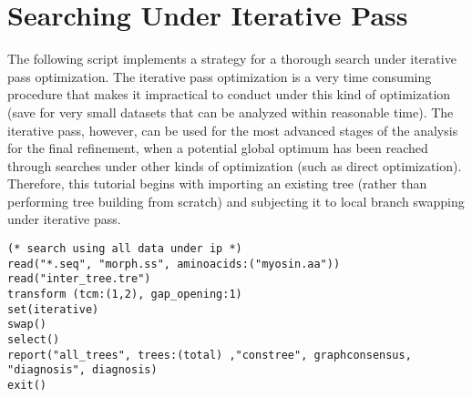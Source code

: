 \section{Searching Under Iterative Pass}{\label{tutorial2}}
The following script implements a strategy for a thorough search under iterative pass optimization. The iterative pass optimization is a very time consuming procedure that makes it impractical to conduct under this kind of optimization (save for very small datasets that can be analyzed within reasonable time). The iterative pass, however, can be used for the most advanced stages of the analysis for the final refinement, when a potential global optimum has been reached through searches under other kinds of optimization (such as direct optimization). Therefore, this tutorial begins with importing an existing tree (rather than performing tree building from scratch) and subjecting it to local branch swapping under iterative pass.

\begin{verbatim}
(* search using all data under ip *)
read("*.seq", "morph.ss", aminoacids:("myosin.aa"))
read("inter_tree.tre")
transform (tcm:(1,2), gap_opening:1)
set(iterative)
swap()
select()
report("all_trees", trees:(total) ,"constree", graphconsensus,
"diagnosis", diagnosis)
exit()
\end{verbatim}


